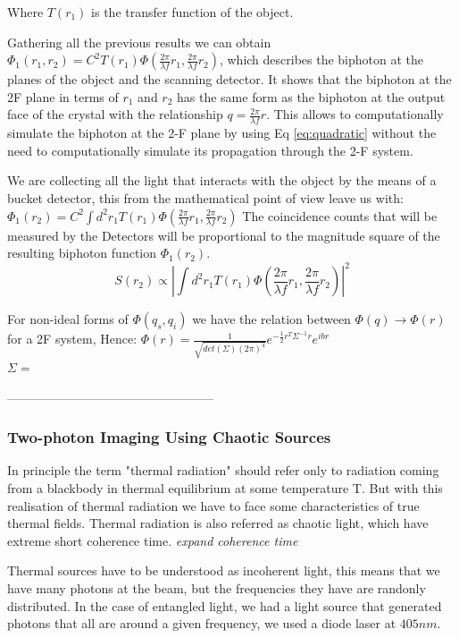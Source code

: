 Where $T(r_1)$ is the transfer function of the object.

Gathering all the previous results we can obtain $\Phi_1 (r_1 , r_2 )=C^2 T(r_1) \Phi (\frac{2 \pi}{\lambda f}r_1, \frac{2 \pi}{\lambda f}r_2)$, which describes the biphoton at the planes of the object and the scanning detector. It shows that the biphoton at the 2F plane in terms of
$r_1$ and $r_2$  has the same form as the biphoton at the
output face of the crystal with the relationship $q = \frac{2 \pi}{\lambda f} r$.
This allows to computationally simulate the biphoton at the 2-F plane by using Eq \ref{eq:quadratic} without the need to computationally simulate its propagation through the 2-F system.

We are collecting all the light that interacts with the object by the means of a bucket detector, this from the mathematical point of view leave us with: 
 $\Phi_1 (r_2) = C^2 \int d^2 r_1 T(r_1) \Phi (\frac{2 \pi}{\lambda f}r_1, \frac{2 \pi}{\lambda f}r_2)$ 
The coincidence counts that will be measured by the Detectors will be proportional to the magnitude square of the resulting biphoton function $\Phi_1 (r_2)$.
\begin{equation}
S(r_2) \propto |  \int d^2 r_1 T(r_1) \Phi (\frac{2 \pi}{\lambda f}r_1, \frac{2 \pi}{\lambda f}r_2) |^2
\end{equation}

For non-ideal forms of $\Phi (q_s,q_i)$ we have the relation between $\Phi (q) \rightarrow \Phi (r)$ for a 2F system, Hence: $\Phi(r)=\frac{1}{\sqrt{det(\Sigma)(2 \pi)^4}} e^{- \frac{1}{2} r^T \Sigma^{-1} r} e^{ibr}$ \\
$\Sigma=$


--------------------------------------------------
\subsubsection{Two-photon Imaging Using Chaotic Sources}

In principle the term "thermal radiation" should refer only to radiation coming 
from a blackbody in thermal equilibrium at some temperature T. But with this realisation of thermal radiation
we have to face some characteristics of true thermal fields. Thermal radiation is also referred as chaotic light, which
have extreme short coherence time.  \textit{expand coherence time}

Thermal sources have to be understood as incoherent light, this means that we have many photons at the beam, but the frequencies they have are 
randonly distributed. In the case of entangled light, we had a light source that generated photons that all are around a given frequency, we used a diode laser at $405nm$.


